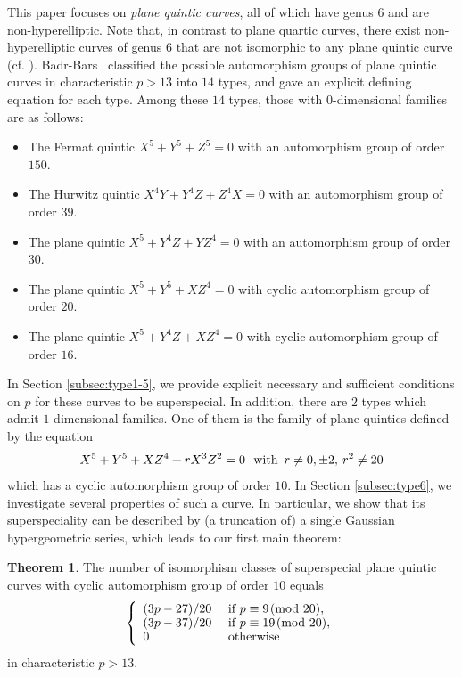 \documentclass{article}
\theoremstyle{definition}
\newtheorem{Thm}[Def]{Theorem}
\begin{document}
This paper focuses on \emph{plane quintic curves}, all of which have genus $6$ and are non-hyperelliptic.
Note that, in contrast to plane quartic curves, there exist non-hyperelliptic curves of genus $6$ that are not isomorphic to any plane quintic curve (cf. \cite[Example\hspace{1mm}IV.5.6]{Hartshorne}).
Badr-Bars~\cite{BB} classified the possible automorphism groups of plane quintic curves in characteristic $p > 13$ into $14$ types, and gave an explicit defining equation for each type.
Among these $14$ types, those with $0$-dimensional families are as follows:
\begin{itemize}
\item The Fermat quintic $X^5+Y^5+Z^5 = 0$ with an automorphism group of order $150$.\vspace{-1.2mm}
\item The Hurwitz quintic $X^4Y+Y^4Z+Z^4X = 0$ with an automorphism group of order $39$.\vspace{-1.2mm}
\item The plane quintic $X^5+Y^4Z+YZ^4 = 0$ with an automorphism group of order $30$.\vspace{-1.2mm}
\item The plane quintic $X^5+Y^5+XZ^4 = 0$ with cyclic automorphism group of order $20$.\vspace{-1.2mm}
\item The plane quintic $X^5+Y^4Z+XZ^4 = 0$ with cyclic automorphism group of order $16$.\vspace{0.6mm}
\end{itemize}
In Section \ref{subsec:type1-5}, we provide explicit necessary and sufficient conditions on $p$ for these curves to be superspecial.
In addition, there are $2$ types which admit $1$-dimensional families.
One of them is the family of plane quintics defined by the equation\vspace{-1mm}
\[
    X^5+Y^5+XZ^4+rX^3Z^2 = 0 \ \text{ with }\,r \neq 0,\pm 2,\hspace{0.7mm}r^2 \neq 20\vspace{-0.2mm}
\]
which has a cyclic automorphism group of order $10$.
In Section \ref{subsec:type6}, we investigate several properties of such a curve.
In particular, we show that its superspeciality can be described by (a truncation of) a single Gaussian hypergeometric series, which leads to our first main theorem:\vspace{-0.8mm}
\begin{Thm}\label{thm:main-10}
The number of isomorphism classes of superspecial plane quintic curves with cyclic automorphism group of order $10$ equals\vspace{-0.4mm}
\[
    \left\{ 
        \begin{array}{ll}
            (3p-27)/20 & \text{ if } p \equiv 9 \!\!\pmod{20},\\[-0.2mm]
            (3p-37)/20 & \text{ if } p \equiv 19 \!\!\pmod{20},\\[-0.2mm]
            0 & \text{ otherwise}
        \end{array}
    \right.\vspace{-1.2mm}
\]
in characteristic $p > 13$.\vspace{-0.8mm}
\end{Thm}
\end{document}
